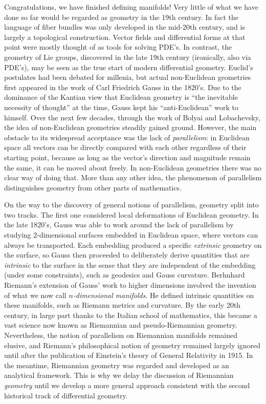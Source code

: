 \begin{hrem*}
    \small
    Congratulations, we have finished defining manifolds! Very little of what we have done so far would be regarded as geometry in the 19th century. In fact the language of fiber bundles was only developed in the mid-20th century, and is largely a topological construction. Vector fields and differential forms at that point were mostly thought of as tools for solving PDE's. In contrast, the geometry of Lie groups, discovered in the late 19th century (ironically, also via PDE's), may be seen as the true start of modern differential geometry. Euclid's postulates had been debated for millenia, but actual non-Euclidean geometries first appeared in the work of Carl Friedrich Gauss in the 1820's. Due to the dominance of the Kantian view that Euclidean geometry is ``the inevitable necessity of thought'' at the time, Gauss kept his ``anti-Euclidean'' work to himself. Over the next few decades, through the work of Bolyai and Lobachevsky, the idea of non-Euclidean geometries steadily gained ground. However, the main obstacle to its widespread acceptance was the lack of \emph{parallelism}: in Euclidean space all vectors can be directly compared with each other regardless of their starting point, because as long as the vector's direction and magnitude remain the same, it can be moved about freely. In non-Euclidean geometries there was no clear way of doing that. More than any other idea, the phenomenon of parallelism distinguishes geometry from other parts of mathematics.
    
    On the way to the discovery of general notions of parallelism, geometry split into two tracks. The first one considered local deformations of Euclidean geometry. In the late 1820's, Gauss was able to work around the lack of parallelism by studying 2-dimensional surfaces embedded in Euclidean space, where vectors can always be transported. Each embedding produced a specific \emph{extrinsic} geometry on the surface, so Gauss then proceeded to deliberately derive quantities that are \emph{intrinsic} to the surface in the sense that they are independent of the embedding (under some constraints), such as geodesics and Gauss curvature. Berhnhard Riemann's extension of Gauss' work to higher dimensions involved the invention of what we now call \emph{$n$-dimensional manifolds}. He defined intrinsic quantities on these manifolds, such as Riemann metrics and curvature. By the early 20th century, in large part thanks to the Italian school of mathematics, this became a vast science now known as Riemannian and pseudo-Riemannian geometry. Nevertheless, the notion of parallelism on Riemannian manifolds remained elusive, and Riemann's philosophical notion of geometry remained largely ignored until after the publication of Einstein's theory of General Relativity in 1915. In the meantime, Riemannian geometry was regarded and developed as an analytical framework. This is why we delay the discussion of Riemannian \emph{geometry} until we develop a more general approach consistent with the second historical track of differential geometry.


\end{hrem*}
